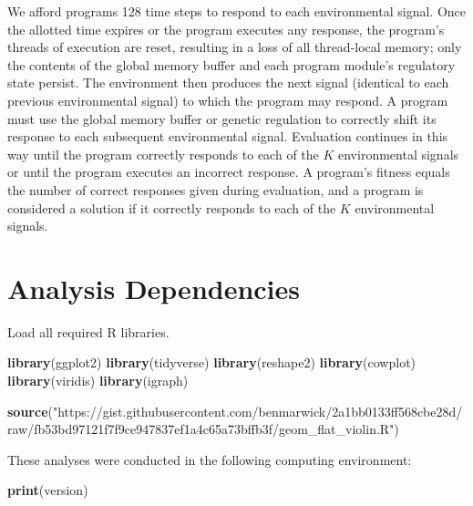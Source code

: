 \documentclass[
]{book}
\newenvironment{Shaded}{\begin{snugshade}}{\end{snugshade}}
\newcommand{\KeywordTok}[1]{\textcolor[rgb]{0.13,0.29,0.53}{\textbf{#1}}}
\newcommand{\NormalTok}[1]{#1}
\newcommand{\StringTok}[1]{\textcolor[rgb]{0.31,0.60,0.02}{#1}}
\begin{document}
We afford programs 128 time steps to respond to each environmental signal.
Once the allotted time expires or the program executes any response, the program's threads of execution are reset, resulting in a loss of all thread-local memory; only the contents of the global memory buffer and each program module's regulatory state persist.
The environment then produces the next signal (identical to each previous environmental signal) to which the program may respond.
A program must use the global memory buffer or genetic regulation to correctly shift its response to each subsequent environmental signal.
Evaluation continues in this way until the program correctly responds to each of the \(K\) environmental signals or until the program executes an incorrect response.
A program's fitness equals the number of correct responses given during evaluation, and a program is considered a solution if it correctly responds to each of the \(K\) environmental signals.

\hypertarget{analysis-dependencies-1}{%
\section{Analysis Dependencies}\label{analysis-dependencies-1}}

Load all required R libraries.

\begin{Shaded}
\begin{Highlighting}[]
\KeywordTok{library}\NormalTok{(ggplot2)}
\KeywordTok{library}\NormalTok{(tidyverse)}
\KeywordTok{library}\NormalTok{(reshape2)}
\KeywordTok{library}\NormalTok{(cowplot)}
\KeywordTok{library}\NormalTok{(viridis)}
\KeywordTok{library}\NormalTok{(igraph)}

\KeywordTok{source}\NormalTok{(}\StringTok{"https://gist.githubusercontent.com/benmarwick/2a1bb0133ff568cbe28d/raw/fb53bd97121f7f9ce947837ef1a4c65a73bffb3f/geom\_flat\_violin.R"}\NormalTok{)}
\end{Highlighting}
\end{Shaded}

These analyses were conducted in the following computing environment:

\begin{Shaded}
\begin{Highlighting}[]
\KeywordTok{print}\NormalTok{(version)}
\end{Highlighting}
\end{Shaded}
\end{document}
